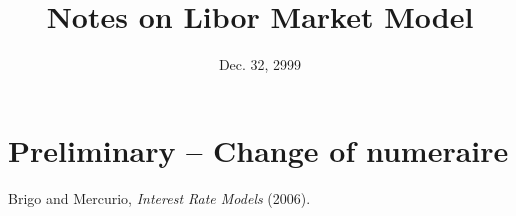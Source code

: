 \documentclass[12pt]{article}
\begin{document}
\title{Notes on Libor Market Model}
\date{Dec. 32, 2999}

\maketitle

\section{Preliminary -- Change of numeraire}



\begin{thebibliography}{99}
    Brigo and Mercurio, {\it Interest Rate Models} (2006).
\end{thebibliography}
\end{document}
